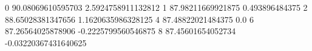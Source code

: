 0 90.08069610595703 2.5924758911132812
1 87.98211669921875 0.493896484375
2 88.65028381347656 1.1620635986328125
4 87.48822021484375 0.0
6 87.26564025878906 -0.2225799560546875
8 87.45601654052734 -0.03220367431640625
